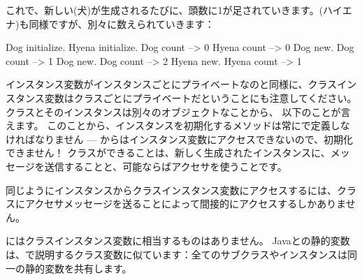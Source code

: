 \documentclass[a4paper,10pt,twoside]{book}
\begin{document}
これで、新しい(犬)が生成されるたびに、頭数に1が足されていきます。(ハイエナ)も同様ですが、別々に数えられていきます：
\begin{code}{}
Dog initialize.
Hyena initialize.
Dog count     --> 0
Hyena count --> 0
Dog new.
Dog count     --> 1
Dog new.
Dog count     --> 2
Hyena new.
Hyena count --> 1
\end{code}

インスタンス変数がインスタンスごとにプライベートなのと同様に、クラスインスタンス変数はクラスごとにプライベートだということにも注意してください。
クラスとそのインスタンスは別々のオブジェクトなことから、
以下のことが言えます。
このことから、インスタンスを初期化するメソッドは常にで定義しなければなりません --- からはインスタンス変数にアクセスできないので、初期化できません！
クラスができることは、新しく生成されたインスタンスに、メッセージを送信することと、可能ならばアクセサを使うことです。

同じようにインスタンスからクラスインスタンス変数にアクセスするには、クラスにアクセサメッセージを送ることによって間接的にアクセスするしかありません。

にはクラスインスタンス変数に相当するものはありません。
Javaとの静的変数は、で説明するクラス変数に似ています：全てのサブクラスやインスタンスは同一の静的変数を共有します。
\end{document}
